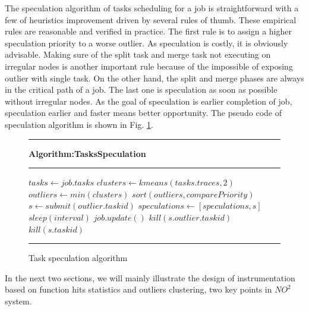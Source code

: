 The speculation algorithm of tasks scheduling for a job is straightforward with a few of heuristics improvement driven by several rules of thumb. These empirical rules are reasonable and verified in practice. The first rule is to assign a higher speculation priority to a worse outlier. As speculation is costly, it is obviously advisable. Making sure of the split task and merge task not executing on irregular nodes is another important rule because of the impossible of exposing outlier with single task. On the other hand, the split and merge phases are always in the critical path of a job. The last one is speculation as soon as possible without irregular nodes. As the goal of speculation is earlier completion of job, speculation earlier and faster means better opportunity. The pseudo code of speculation algorithm is shown in Fig. \ref{fig-spec-algo}.

\begin{figure}
\rule[-.2pt]{0.9\columnwidth}{0.9pt}
\textbf{Algorithm:TasksSpeculation}
\rule[-.2pt]{0.9\columnwidth}{0.5pt}

\begin{algorithmic}[1]

    \State $tasks\gets job.tasks$
    \State $clusters\gets kmeans(tasks.traces, 2)$
        \State $outliers\gets min(clusters)$
        \State $sort(outliers, comparePriority)$
            \State $s\gets submit(outlier.taskid)$
            \State $speculations\gets [speculations, s]$
        \EndFor
    \EndIf
    \State $sleep(interval)$
    \State $job.update()$
            \State $kill(s.outlier.taskid)$
            \State $kill(s.taskid)$
        \EndIf
    \EndFor
\EndWhile\label{specendwhile}
\end{algorithmic}
\rule[-.2pt]{0.9\columnwidth}{0.8pt}
\caption{Task speculation algorithm}\label{fig-spec-algo}
\end{figure}

In the next two sections, we will mainly illustrate the design of instrumentation based on function hits statistics and outliers clustering, two key points in $NO^2$ system. 